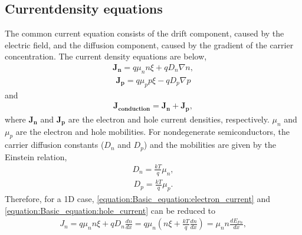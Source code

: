 \documentclass[letterpaper,10pt,english]{sphinxmanual}
\numberwithin{equation}{section}
\begin{document}
\subsection{Current\sphinxhyphen{}density equations}
\label{\detokenize{Basic_equation:current-density-equations}}
\sphinxAtStartPar
The common current equation consists of the drift component, caused by the electric field, and the diffusion component, caused by the gradient of the carrier concentration.
The current density equations are below,
\begin{equation}\label{equation:Basic_equation:electron_current}
\begin{split}\mathbf{J_n} = q\mu_nn\xi + qD_n\nabla n,\end{split}
\end{equation}\begin{equation}\label{equation:Basic_equation:hole_current}
\begin{split}\mathbf{J_p} = q\mu_pp\xi - qD_p\nabla p\end{split}
\end{equation}
\sphinxAtStartPar
and
\begin{equation}\label{equation:Basic_equation:total_current}
\begin{split}\mathbf{J_{conduction}} = \mathbf{J_n} + \mathbf{J_p},\end{split}
\end{equation}
\sphinxAtStartPar
where \(\mathbf{J_n}\) and \(\mathbf{J_p}\) are the electron and hole current densities, respectively.
\(\mu_n\) and \(\mu_ p\) are the electron and hole mobilities.
For nondegenerate semiconductors, the carrier diffusion constants (\(D_n\) and \(D_p\)) and the mobilities are given by the Einstein relation,
\begin{equation}\label{equation:Basic_equation:electron_diffusion}
\begin{split}D_n = \frac{kT}{q}\mu_n,\end{split}
\end{equation}\begin{equation}\label{equation:Basic_equation:hole_diffusion}
\begin{split}D_p = \frac{kT}{q}\mu_p.\end{split}
\end{equation}
\sphinxAtStartPar
Therefore, for a 1D case, \eqref{equation:Basic_equation:electron_current} and \eqref{equation:Basic_equation:hole_current} can be reduced to
\begin{equation}\label{equation:Basic_equation:electron_current_quasi_fermi}
\begin{split}J_n = q\mu_nn\xi + qD_n\frac{dn}{dx} = q\mu_n\left(n\xi + \frac{kT}{q}\frac{dn}{dx}\right) = \mu_nn\frac{dE_{Fn}}{dx},\end{split}
\end{equation}
\end{document}

